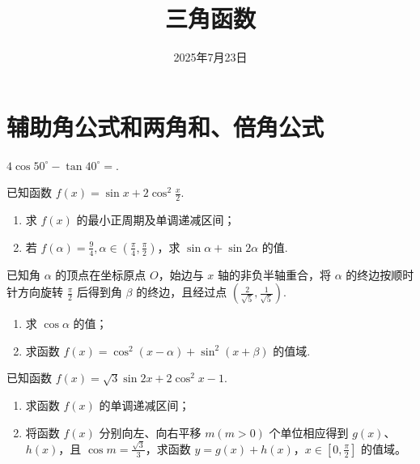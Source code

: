 \documentclass[a4paper , final]{ctexart}
\title{三角函数}
\date{2025年7月23日}
\newenvironment{problem}[1]{%
  \item #1
  \par
  \vspace{8cm}
}{}
\begin{document}
\maketitle

\section*{辅助角公式和两角和、倍角公式}

\begin{problems}
  \begin{problem}
        {
            $4\cos{50^\circ}-\tan{40^\circ}=$\underline{\hspace{1.5cm}}.
        }
    \end{problem}
  \begin{problem}
    {
      已知函数 $f(x) = \sin x +2\cos^2\frac{x}{2}$.
      \begin{enumerate}[label=(\arabic*)]
        \item 求 $f(x)$ 的最小正周期及单调递减区间；
        \item 若 $f(\alpha)=\frac94,\alpha\in(\frac{\pi}{4},\frac{\pi}{2})$，求 $\sin\alpha+\sin 2\alpha$ 的值.
      \end{enumerate}
    }
  \end{problem}

  \begin{problem}
    {
      已知角 $\alpha$ 的顶点在坐标原点 $O$，始边与 $x$ 轴的非负半轴重合，将 $\alpha$ 的终边按顺时针方向旋转 $\frac{\pi}{2}$ 后得到角 $\beta$ 的终边，且经过点 $(\frac{2}{\sqrt{5}}, \frac{1}{\sqrt{5}})$.
      \begin{enumerate}[label=(\arabic*)]
        \item 求 $\cos \alpha$ 的值；
        \item 求函数 $f(x) = \cos^2(x-\alpha) + \sin^2(x+\beta)$ 的值域.
      \end{enumerate}
    }
  \end{problem}

  \begin{problem}
    {
      已知函数 $f(x) = \sqrt{3} \sin 2x + 2\cos^2 x - 1$.
      \begin{enumerate}[label=(\arabic*)]
        \item 求函数 $f(x)$ 的单调递减区间；
        \item 将函数 $f(x)$ 分别向左、向右平移 $m(m>0)$ 个单位相应得到 $g(x)$、$h(x)$，且 $\cos m = \frac{\sqrt{3}}{3}  $，求函数 $y = g(x) + h(x)$，$x \in [0, \frac{\pi}{2}]$ 的值域。
      \end{enumerate}
    }
\end{problem}
\end{problems}
\end{document}
